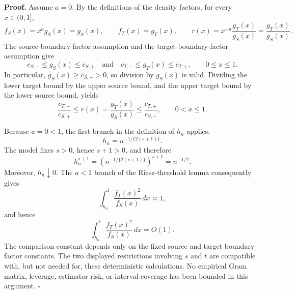 \textbf{Proof.}
Assume \(a=0\). By the definitions of the density factors, for every \(x\in(0,1]\),
\[
f_S(x)=x^a g_S(x)=g_S(x),
\qquad
f_T(x)=g_T(x),
\qquad
r(x)=x^{-a}\frac{g_T(x)}{g_S(x)}=\frac{g_T(x)}{g_S(x)}.
\]
The source-boundary-factor assumption and the target-boundary-factor assumption give
\[
c_{S,-}\le g_S(x)\le c_{S,+}
\quad\text{and}\quad
c_{T,-}\le g_T(x)\le c_{T,+},
\qquad 0\le x\le1.
\]
In particular, \(g_S(x)\ge c_{S,-}>0\), so division by \(g_S(x)\) is valid. Dividing the lower target bound by the upper source bound, and the upper target bound by the lower source bound, yields
\[
\frac{c_{T,-}}{c_{S,+}}
\le r(x)=\frac{g_T(x)}{g_S(x)}
\le\frac{c_{T,+}}{c_{S,-}},
\qquad 0<x\le1.
\]

Because \(a=0<1\), the first branch in the definition of \(h_n\) applies:
\[
h_n=n^{-1/\{2(s+1)\}}.
\]
The model fixes \(s>0\), hence \(s+1>0\), and therefore
\[
h_n^{s+1}
=\left(n^{-1/\{2(s+1)\}}\right)^{s+1}
=n^{-1/2}.
\]
Moreover, \(h_n\downarrow0\). The \(a<1\) branch of the Riesz-threshold lemma consequently gives
\[
\int_{h_n}^1\frac{f_T(x)^2}{f_S(x)}\,dx\asymp1,
\]
and hence
\[
\int_{h_n}^1\frac{f_T(x)^2}{f_S(x)}\,dx=O(1).
\]
The comparison constant depends only on the fixed source and target boundary-factor constants. The two displayed restrictions involving \(s\) and \(t\) are compatible with, but not needed for, these deterministic calculations. No empirical Gram matrix, leverage, estimator risk, or interval coverage has been bounded in this argument. \(\square\)